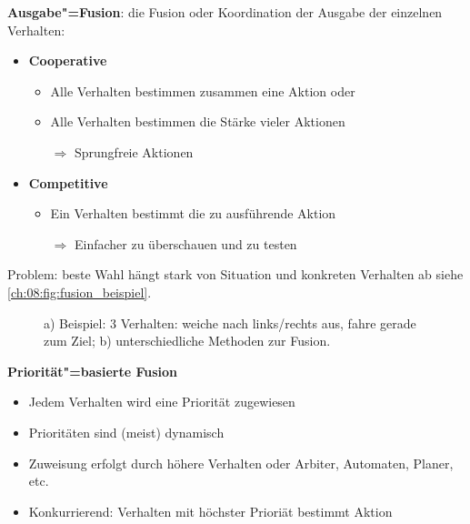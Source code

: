 \textbf{Ausgabe"=Fusion}: die Fusion oder Koordination der Ausgabe der einzelnen Verhalten:
\begin{itemize}
	\item \textbf{Cooperative}
	\begin{itemize}
		\item Alle Verhalten bestimmen zusammen eine Aktion oder 
		\item Alle Verhalten bestimmen die Stärke vieler Aktionen 
		\item[$\Rightarrow$] Sprungfreie Aktionen
	\end{itemize}
	\item \textbf{Competitive}
	\begin{itemize}
		\item Ein Verhalten bestimmt die zu ausführende Aktion
		\item[$\Rightarrow$] Einfacher zu überschauen und zu testen
	\end{itemize}
\end{itemize}
Problem: beste Wahl hängt stark von Situation und konkreten Verhalten ab siehe \autoref{ch:08:fig:fusion_beispiel}.

\begin{figure}
	\centering
	\par\medskip
	\caption{a) Beispiel: 3 Verhalten: weiche nach links/rechts aus, fahre gerade zum Ziel; b) unterschiedliche Methoden zur Fusion.}
	\label{ch:08:fig:fusion_beispiel}
\end{figure}

\textbf{Priorität"=basierte Fusion}
\begin{itemize}
	\item Jedem Verhalten wird eine Priorität zugewiesen
	\item Prioritäten sind (meist) dynamisch
	\item Zuweisung erfolgt durch höhere Verhalten oder Arbiter, Automaten, Planer, etc.
	\item Konkurrierend: Verhalten mit höchster Prioriät bestimmt Aktion
\end{itemize}

